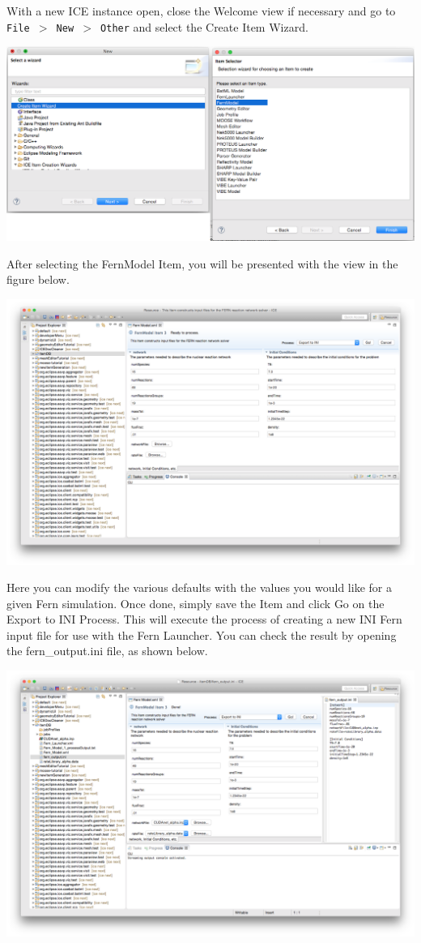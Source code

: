 With a new ICE instance open, close the Welcome view if necessary and go to
\texttt{File $>$ New $>$ Other} and select the Create Item Wizard. 
\begin{center} \includegraphics[width=\textwidth]{figures/creatingFernModelItem}
\end{center}
After selecting the FernModel Item, you will be presented with the view in the
figure below. 
\begin{center} \includegraphics[width=\textwidth]{figures/fernmodelItem}
\end{center}
Here you can modify the various defaults with the values you would like for a
given Fern simulation. Once done, simply save the Item and click Go on the
Export to INI Process. This will execute the process of creating a new INI Fern
input file for use with the Fern Launcher. You can check the result by opening
the fern\_output.ini file, as shown below. 
\begin{center} \includegraphics[width=\textwidth]{figures/result}
\end{center}

